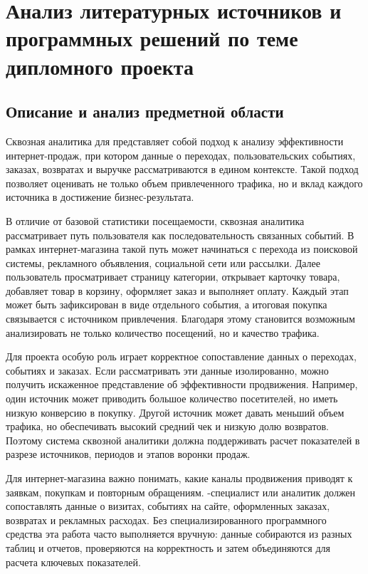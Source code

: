 \section{Анализ литературных источников и программных решений по теме дипломного проекта}

\subsection{Описание и анализ предметной области}

Сквозная аналитика для  представляет собой подход к анализу эффективности интернет-продаж, при котором данные о переходах, пользовательских событиях, заказах, возвратах и выручке рассматриваются в едином контексте. Такой подход позволяет оценивать не только объем привлеченного трафика, но и вклад каждого источника в достижение бизнес-результата.

В отличие от базовой статистики посещаемости, сквозная аналитика рассматривает путь пользователя как последовательность связанных событий. В рамках интернет-магазина такой путь может начинаться с перехода из поисковой системы, рекламного объявления, социальной сети или рассылки. Далее пользователь просматривает страницу категории, открывает карточку товара, добавляет товар в корзину, оформляет заказ и выполняет оплату. Каждый этап может быть зафиксирован в виде отдельного события, а итоговая покупка связывается с источником привлечения. Благодаря этому становится возможным анализировать не только количество посещений, но и качество трафика.

Для  проекта особую роль играет корректное сопоставление данных о переходах, событиях и заказах. Если рассматривать эти данные изолированно, можно получить искаженное представление об эффективности продвижения. Например, один источник может приводить большое количество посетителей, но иметь низкую конверсию в покупку. Другой источник может давать меньший объем трафика, но обеспечивать высокий средний чек и низкую долю возвратов. Поэтому система сквозной аналитики должна поддерживать расчет показателей в разрезе источников, периодов и этапов воронки продаж.

Для интернет-магазина важно понимать, какие каналы продвижения приводят к заявкам, покупкам и повторным обращениям. -специалист или аналитик должен сопоставлять данные о визитах, событиях на сайте, оформленных заказах, возвратах и рекламных расходах. Без специализированного программного средства эта работа часто выполняется вручную: данные собираются из разных таблиц и отчетов, проверяются на корректность и затем объединяются для расчета ключевых показателей.

